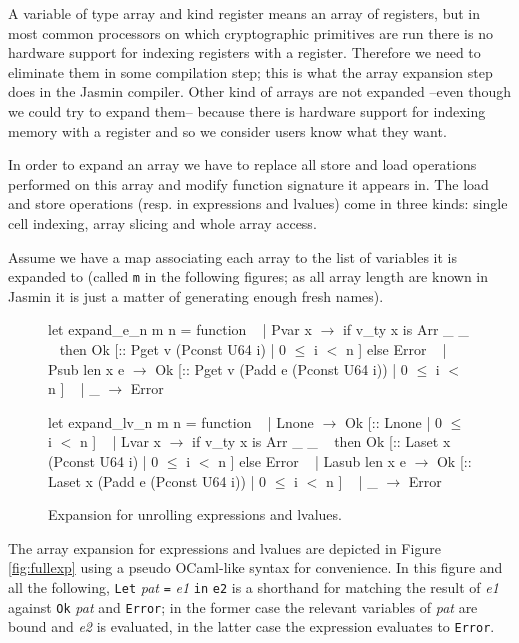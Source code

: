 \documentclass{article}
\begin{document}
A variable of type array and kind register means an array of registers, but in
most common processors on which cryptographic primitives are run there is no
hardware support for indexing registers with a register. Therefore we need to
eliminate them in some compilation step; this is what the array expansion step
does in the Jasmin compiler. Other kind of arrays are not expanded --even though
we could try to expand them-- because there is hardware support for indexing
memory with a register and so we consider users know what they want.

In order to expand an array we have to replace all store and load operations
performed on this array and modify function signature it appears in. The load
and store operations (resp. in expressions and lvalues) come in three kinds:
single cell indexing, array slicing and whole array access.

\smallskip

Assume we have a map associating each array to the list of variables it is
expanded to (called \texttt{m} in the following figures; as all array length are
known in Jasmin it is just a matter of generating enough fresh names).

\medskip

\begin{figure}[t]
\obeylines\obeyspaces\ttfamily%
let expand\_e\_n m n = function
~ | Pvar x       \(\rightarrow\) if v\_ty x is Arr \_ \_
~   then Ok [:: Pget v (Pconst U64 i) | 0 \(\leq\) i \(<\) n ] else Error
~ | Psub len x e \(\rightarrow\) Ok [:: Pget v (Padd e (Pconst U64 i)) | 0 \(\leq\) i \(<\) n ]
~ | \_ \(\rightarrow\) Error
 
let expand\_lv\_n m n = function
~ | Lnone         \(\rightarrow\) Ok [:: Lnone | 0 \(\leq\) i \(<\) n ]
~ | Lvar x        \(\rightarrow\) if v\_ty x is Arr \_ \_
~   then Ok [:: Laset x (Pconst U64 i) | 0 \(\leq\) i \(<\) n ] else Error
~ | Lasub len x e \(\rightarrow\) Ok [:: Laset x (Padd e (Pconst U64 i)) | 0 \(\leq\) i \(<\) n ]
~ | \_             \(\rightarrow\) Error
\normalfont%
\caption{Expansion for unrolling expressions and lvalues.}\label{fig:unrexp}
\end{figure}

The array expansion for expressions and lvalues are depicted in Figure
\ref{fig:fullexp} using a pseudo OCaml-like syntax for convenience.
In this figure and all the following, \texttt{Let} \textit{pat} \texttt{=}
\textit{e1} \texttt{in} \texttt{e2} is a shorthand for matching the result of
\textit{e1} against \texttt{Ok} \textit{pat} and \texttt{Error}; in the former
case the relevant variables of \textit{pat} are bound and \textit{e2} is
evaluated, in the latter case the expression evaluates to \texttt{Error}.
\end{document}
